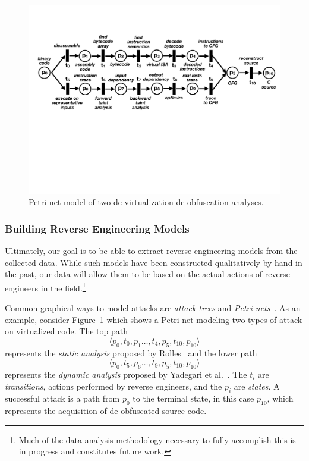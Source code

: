 \begin{figure}[t]
\vspace*{-10mm}
\hspace*{-8mm}\includegraphics[width=.5\textwidth]{petrivirt.pdf}
\vspace*{-25mm}
\caption{Petri net model of two de-virtualization de-obfuscation analyses.}
\label{fig:petrinet}
\end{figure}

\subsubsection{Building Reverse Engineering Models}
Ultimately, our goal is to be able to extract reverse engineering models from the collected data. While such models have been constructed qualitatively by hand in the past, our data will allow them to be based on the actual actions of reverse engineers in the field.\footnote{Much of the data analysis methodology necessary to fully accomplish this is in progress and constitutes future work.}

Common graphical ways to model attacks are {\em attack trees} and {\em Petri nets}~\cite{su2018method, zhang2016attack, basile2019meta,Wang2013}. As an example, consider Figure~\ref{fig:petrinet} which shows a Petri net modeling two types of attack on virtualized code.
The top path 
\[\langle p_0,t_0,p_1\ldots,t_4,p_5,t_{10},p_{10}\rangle
\]
represents the {\em static analysis} proposed by Rolles~\cite{rolles09unpacking} and the lower path 
\[\langle p_0,t_5,p_6\ldots,t_9,p_5,t_{10},p_{10}\rangle
\]
represents the {\em dynamic analysis} proposed by Yadegari et al.~\cite{yadegari15symbolic}. The $t_i$ are {\em transitions}, actions performed by reverse engineers, and the $p_i$ are {\em states}. A successful attack is a path from $p_0$ to the terminal state, in this case $p_{10}$, which represents the acquisition of de-obfuscated source code. 


